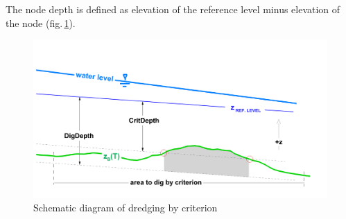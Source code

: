 \newpage
The node depth is defined as elevation of the reference level minus elevation of the node (fig.\,\ref{E3schema}).
\begin{figure} [H]
\centering
\includegraphics[scale=0.12]{img/critDig_schematicDiagram.png}
\caption{Schematic diagram of dredging by criterion}\label{E3schema}
\end{figure}

